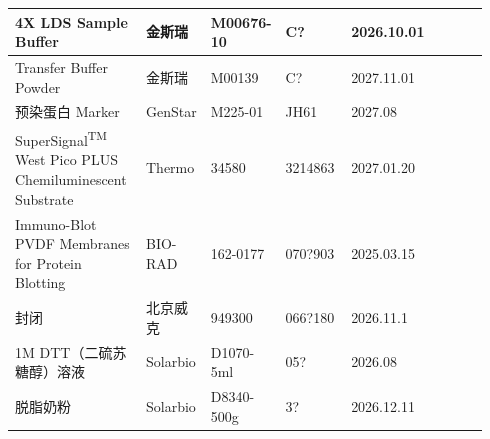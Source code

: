 \documentclass[UTF8,10pt,a4paper,fontset=fandol]{ctexart}
\newcommand{\fieldvalue}[1]{#1}
\newcommand{\handwritten}[1]{#1}
\begin{document}
\begin{center}
\begin{tabular}{|p{0.29\linewidth}|p{0.13\linewidth}|p{0.14\linewidth}|p{0.14\linewidth}|p{0.11\linewidth}|p{0.13\linewidth}|}
\hline
4X LDS Sample Buffer & 金斯瑞 & M00676-10 &
\fieldvalue{\handwritten{C?}} &
\fieldvalue{\handwritten{2026.10.01}} & \\
\hline
Transfer Buffer Powder & 金斯瑞 & M00139 &
\fieldvalue{\handwritten{C?}} &
\fieldvalue{\handwritten{2027.11.01}} & \\
\hline
预染蛋白 Marker & GenStar & M225-01 &
\fieldvalue{\handwritten{JH61}} &
\fieldvalue{\handwritten{2027.08}} & \\
\hline
SuperSignal\textsuperscript{TM} West Pico PLUS Chemiluminescent Substrate & Thermo & 34580 &
\fieldvalue{\handwritten{3214863}} &
\fieldvalue{\handwritten{2027.01.20}} & \\
\hline
Immuno-Blot PVDF Membranes for Protein Blotting & BIO-RAD & 162-0177 &
\fieldvalue{\handwritten{070?903}} &
\fieldvalue{\handwritten{2025.03.15}} & \\
\hline
封闭 & 北京威克 & 949300 &
\fieldvalue{\handwritten{066?180}} &
\fieldvalue{\handwritten{2026.11.1}} & \\
\hline
1M DTT（二硫苏糖醇）溶液 & Solarbio & D1070-5ml &
\fieldvalue{\handwritten{05?}} &
\fieldvalue{\handwritten{2026.08}} & \\
\hline
脱脂奶粉 & Solarbio & D8340-500g &
\fieldvalue{\handwritten{3?}} &
\fieldvalue{\handwritten{2026.12.11}} & \\
\hline
\end{tabular}
\end{center}
\end{document}
